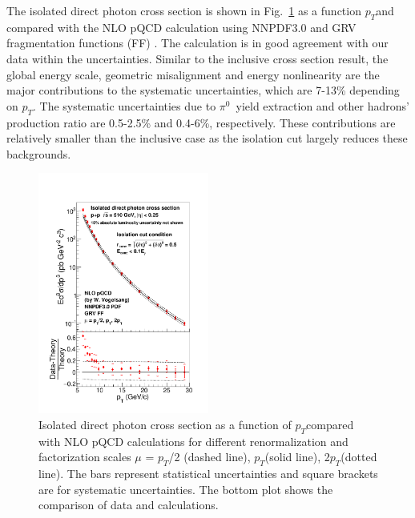 \documentclass[twocolumn,letterpaper,aps,prl,longbibliography,superscriptaddress,floatfix]{revtex4-2}
\newcommand{\pT}{\ensuremath{p_T}}
\newcommand{\pizero}{\ensuremath{\pi^0}}
\begin{document}
The isolated direct photon cross section is shown in Fig.~\ref{fig:iso} as a function \pT and compared with the NLO pQCD calculation \cite{PhysRevD.48.3136,PhysRevD.50.1901} using NNPDF3.0 \cite{Ball2015,Bonvini2015} and GRV fragmentation functions (FF) \cite{PhysRevD.45.3986}. The calculation is in good agreement with our data within the uncertainties. Similar to the inclusive cross section result, the global energy scale, geometric misalignment and energy nonlinearity are the major contributions to the systematic uncertainties, which are 7-13\% depending on \pT. The systematic uncertainties due to \pizero\ yield extraction and other hadrons' production ratio are 0.5-2.5\% and 0.4-6\%, respectively. These contributions are relatively smaller than the inclusive case as the isolation cut largely reduces these backgrounds.
\begin{figure} 
\centering
\includegraphics[width=0.5\textwidth]{CrossSection-isophoton-werner}
\caption{Isolated direct photon cross section as a function of \pT compared with NLO pQCD calculations \cite{PhysRevD.48.3136,PhysRevD.50.1901} for different renormalization and factorization scales $\mu$ = \pT/2 (dashed line), \pT (solid line), 2\pT (dotted line). The bars represent statistical uncertainties and square brackets are for systematic uncertainties. The bottom plot shows the comparison of data and calculations.}
\label{fig:iso}
\end{figure}
\end{document}
